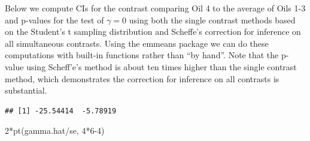 \documentclass[
]{book}
\newenvironment{Shaded}{\begin{snugshade}}{\end{snugshade}}
\newcommand{\DecValTok}[1]{\textcolor[rgb]{0.00,0.00,0.81}{#1}}
\newcommand{\FloatTok}[1]{\textcolor[rgb]{0.00,0.00,0.81}{#1}}
\newcommand{\FunctionTok}[1]{\textcolor[rgb]{0.00,0.00,0.00}{#1}}
\newcommand{\NormalTok}[1]{#1}
\newcommand{\OtherTok}[1]{\textcolor[rgb]{0.56,0.35,0.01}{#1}}
\newcommand{\SpecialCharTok}[1]{\textcolor[rgb]{0.00,0.00,0.00}{#1}}
\begin{document}
Below we compute CIs for the contrast comparing Oil 4 to the average of Oils 1-3 and p-values for the test of \(\gamma = 0\) using both the single contrast methods based on the Student's t sampling distribution and Scheffe's correction for inference on all simultaneous contrasts. Using the emmeans package we can do these computations with built-in functions rather than ``by hand''. Note that the p-value using Scheff'e's method is about ten times higher than the single contrast method, which demonstrates the correction for inference on all contrasts is substantial.

\begin{Shaded}
\end{Shaded}

\begin{verbatim}
## [1] -25.54414  -5.78919
\end{verbatim}

\begin{Shaded}
\begin{Highlighting}[]
\DecValTok{2}\SpecialCharTok{*}\FunctionTok{pt}\NormalTok{(gamma.hat}\SpecialCharTok{/}\NormalTok{se, }\DecValTok{4}\SpecialCharTok{*}\DecValTok{6{-}4}\NormalTok{)}
\end{Highlighting}
\end{Shaded}
\end{document}
